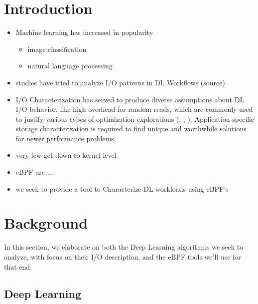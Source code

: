 \documentclass[conference]{IEEEtran}
\begin{document}
\section{Introduction}
\begin{itemize}
    \item Machine learning has increased in popularity
    \begin{itemize}
        \item image classification
        \item natural language processing
    \end{itemize}
    \item studies have tried to analyze I/O patterns in DL Workflows (source)
    \item I/O Characterization has served to produce diverse assumptions about DL I/O behavior, like high overhead for random reads, which are commonly used to justify various types of optimization explorations (\cite{LMDB}, \cite{nvme}, \cite{10.1145/3337821.3337902}). Application-specific storage characterization is required to find unique and worthwhile solutions for newer performance problems.
    \item very few get down to kernel level
    \item eBPF are ...
    \item we seek to provide a tool to Characterize DL workloads using eBPF's
\end{itemize}

\section{Background}

    In this section, we elaborate on both the Deep Learning algorithms we seek to analyze, with focus on their I/O description, and the eBPF tools we'll use for that end.

    \subsection{Deep Learning}
\end{document}
